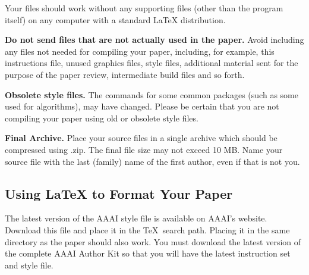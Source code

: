 Your files should work without any supporting files (other than the
program itself) on any computer with a standard {\LaTeX} distribution.

\textbf{Do not send files that are not actually used in the paper.}
Avoid including any files not needed for compiling your paper,
including, for example, this instructions file, unused graphics files,
style files, additional material sent for the purpose of the paper
review, intermediate build files and so forth.

\textbf{Obsolete style files.} The commands for some common packages
(such as some used for algorithms), may have changed. Please be certain
that you are not compiling your paper using old or obsolete style files.

\textbf{Final Archive.} Place your source files in a single archive
which should be compressed using .zip. The final file size may not
exceed 10 MB. Name your source file with the last (family) name of the
first author, even if that is not you.

\subsection{\texorpdfstring{Using {\LaTeX} to Format Your
Paper}{Using  to Format Your Paper}}\label{using-to-format-your-paper}

The latest version of the AAAI style file is available on AAAI's
website. Download this file and place it in the \TeX~search path.
Placing it in the same directory as the paper should also work. You must
download the latest version of the complete AAAI Author Kit so that you
will have the latest instruction set and style file.


